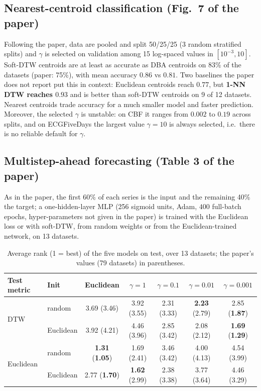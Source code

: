 \subsection{Nearest-centroid classification (Fig.~7 of the paper)}
Following the paper, data are pooled and split 50/25/25 (3 random stratified splits) and $\gamma$ is selected on validation among 15 log-spaced values in $[10^{-3},10]$. Soft-DTW centroids are at least as accurate as DBA centroids on 83\% of the datasets (paper: 75\%), with mean accuracy $0.86$ vs $0.81$. Two baselines the paper does not report put this in context: Euclidean centroids reach $0.77$, but \textbf{1-NN DTW reaches $0.93$} and is better than soft-DTW centroids on 9 of 12 datasets. Nearest centroids trade accuracy for a much smaller model and faster prediction. Moreover, the selected $\gamma$ is unstable: on CBF it ranges from $0.002$ to $0.19$ across splits, and on ECGFiveDays the largest value $\gamma=10$ is always selected, i.e.\ there is no reliable default for $\gamma$.

\subsection{Multistep-ahead forecasting (Table 3 of the paper)}
As in the paper, the first 60\% of each series is the input and the remaining 40\% the target; a one-hidden-layer MLP (256 sigmoid units, Adam, $400$ full-batch epochs, hyper-parameters not given in the paper) is trained with the Euclidean loss or with soft-DTW, from random weights or from the Euclidean-trained network, on 13 datasets.

\begin{table}[h]
\centering\small
\caption{Average rank (1 = best) of the five models on test, over 13 datasets; the paper's values (79 datasets) in parentheses.}
\label{tab:forecast}
\setlength{\tabcolsep}{4pt}
\begin{tabular}{llccccc}
\toprule
Test metric & Init & Euclidean & $\gamma=1$ & $\gamma=0.1$ & $\gamma=0.01$ & $\gamma=0.001$ \\
\midrule
\multirow{2}{*}{DTW} & random & 3.69 (3.46) & 3.92 (3.55) & 2.31 (3.33) & \textbf{2.23} (2.79) & 2.85 (\textbf{1.87}) \\
& Euclidean & 3.92 (4.21) & 4.46 (3.96) & 2.85 (3.42) & 2.08 (2.12) & \textbf{1.69} (\textbf{1.29}) \\
\midrule
\multirow{2}{*}{Euclidean} & random & \textbf{1.31} (\textbf{1.05}) & 1.69 (2.41) & 3.46 (3.42) & 4.00 (4.13) & 4.54 (3.99) \\
& Euclidean & 2.77 (\textbf{1.70}) & \textbf{1.62} (2.99) & 2.38 (3.38) & 3.77 (3.64) & 4.46 (3.29) \\
\bottomrule
\end{tabular}
\end{table}

